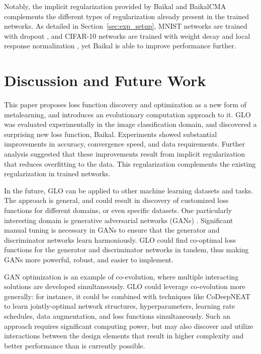 \documentclass[conference]{IEEEtran}
\newcommand{\TECH}{GLO\xspace}
\begin{document}
Notably, the implicit regularization provided by Baikal and BaikalCMA complements the different types of regularization already present in the trained networks. As detailed in Section~\ref{sec:exp_setup}, MNIST networks are trained with dropout \cite{hinton2012improving}, and CIFAR-10 networks are trained with  weight decay and local response normalization \cite{NIPS2012_4824}, yet Baikal is able to improve performance further.


\section{Discussion and Future Work}

This paper proposes loss function discovery and optimization as a new
form of metalearning, and introduces an evolutionary computation
approach to it. \TECH was evaluated experimentally in the image
classification domain, and discovered a surprising new loss function,
Baikal. Experiments showed substantial improvements in accuracy,
convergence speed, and data requirements. Further analysis suggested
that these improvements result from implicit regularization that
reduces overfitting to the data. This regularization complements the existing regularization in trained networks.

In the future, \TECH can be applied to other machine learning datasets
and tasks. The approach is general, and could result in discovery of customized loss functions for different domains, or even specific datasets. One
particularly interesting domain is generative adversarial networks
(GANs) \cite{goodfellow2014generative}. Significant manual tuning is necessary in GANs to ensure that
the generator and discriminator networks learn harmoniously. \TECH
could find co-optimal loss functions for the generator and
discriminator networks in tandem, thus making GANs more powerful,
robust, and easier to implement. 

GAN optimization is an example of co-evolution, where multiple
interacting solutions are developed simultaneously. \TECH could leverage
co-evolution more generally: for instance, it could be combined with
techniques like CoDeepNEAT \cite{miikkulainen2019evolving} to learn jointly-optimal network structures, hyperparameters, learning rate schedules, data
augmentation, and loss functions simultaneously. Such an approach
requires significant computing power, but may also discover and
utilize interactions between the design elements that result in higher
complexity and better performance than is currently possible.
\end{document}
